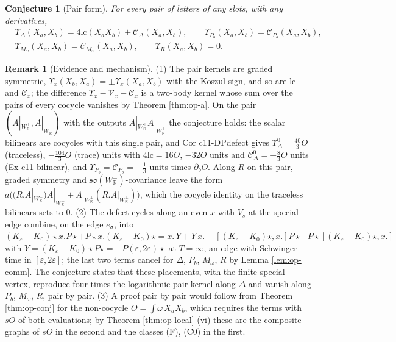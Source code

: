 \documentclass[11pt]{article}
\numberwithin{equation}{section}
\theoremstyle{plain}
\newtheorem{conjecture}[theorem]{Conjecture}
\theoremstyle{definition}
\newtheorem{remark}[theorem]{Remark}
\newcommand{\Ap}{A|_{W_{\mathbb R}^\perp}}
\newcommand{\lc}{\mathrm{lc}}
\newcommand{\Pst}{P\star}
\newcommand{\Comp}{\mathcal C}
\newcommand{\Var}{\mathcal V}
\begin{document}
\begin{conjecture}[Pair form]
\label{conj:op-pair}
For every pair of letters of any slots, with any derivatives,
\[
\begin{aligned}
&\Upsilon_\Delta(X_a,X_b)=4\lc(X_aX_b)+\Comp_\Delta(X_a,X_b),\qquad \Upsilon_{P_b}(X_a,X_b)=\Comp_{P_b}(X_a,X_b),\\
&\Upsilon_{M_\omega}(X_a,X_b)=\Comp_{M_\omega}(X_a,X_b),\qquad\Upsilon_R(X_a,X_b)=0 .
\end{aligned}
\]
\end{conjecture}

\begin{remark}[Evidence and mechanism]
\label{rem:op-pair}
(1) The pair kernels are graded symmetric, $\Upsilon_x(X_b,X_a)=\pm\Upsilon_x(X_a,X_b)$ with the Koszul sign, and so are $\lc$ and $\Comp_x$; the difference $\Upsilon_x-\Var_x-\Comp_x$ is a two-body kernel whose sum over the pairs of every cocycle vanishes by Theorem \ref{thm:op-a}. On the pair $(\Ap,\Ap)$ with the outputs $\Ap\Ap$ the conjecture holds: the scalar bilinears are cocycles with this single pair, and Cor c11-DPdefect gives $\Upsilon^0_\Delta=\tfrac{40}3O$ (traceless), $-\tfrac{104}3O$ (trace) units with $4\lc=16O$, $-32O$ units and $\Comp^0_\Delta=-\tfrac83O$ units (Ex c11-bilinear), and $\Upsilon_{P_b}=\Comp_{P_b}=-\tfrac13$ units times $\partial_bO$. Along $R$ on this pair, graded symmetry and $\mathfrak{so}(W_{\mathbb R}^\perp)$-covariance leave the form $a\big((R.\Ap)\Ap+\Ap(R.\Ap)\big)$, which the cocycle identity on the traceless bilinears sets to $0$. (2) The defect cycles along an even $x$ with $V_s$ at the special edge combine, on the edge $e_\sigma$, into $(K_\varepsilon-K_0)\star x.\Pst+\Pst x.(K_\varepsilon-K_0)\star=x.\,Y+Y\,x.+[(K_\varepsilon-K_0)\star,x.]\Pst-\Pst[(K_\varepsilon-K_0)\star,x.]$ with $Y=(K_\varepsilon-K_0)\star\Pst=-P(\varepsilon,2\varepsilon)\star$ at $T=\infty$, an edge with Schwinger time in $[\varepsilon,2\varepsilon]$; the last two terms cancel for $\Delta$, $P_b$, $M_\omega$, $R$ by Lemma \ref{lem:op-comm}. The conjecture states that these placements, with the finite special vertex, reproduce four times the logarithmic pair kernel along $\Delta$ and vanish along $P_b$, $M_\omega$, $R$, pair by pair. (3) A proof pair by pair would follow from Theorem \ref{thm:op-conj} for the non-cocycle $O=\int\omega\,X_aX_b$, which requires the terms with $sO$ of both evaluations; by Theorem \ref{thm:op-local} (vi) these are the composite graphs of $sO$ in the second and the classes (F), (C0) in the first.
\end{remark}
\end{document}
